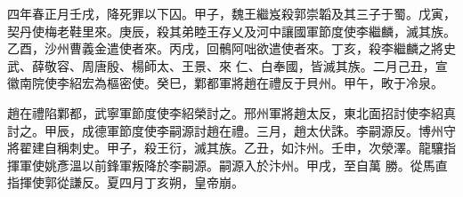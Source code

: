 \begin{pinyinscope}
 四年春正月壬戌，降死罪以下囚。甲子，魏王繼岌殺郭崇韜及其三子于蜀。戊寅，契丹使梅老鞋里來。庚辰，殺其弟睦王存乂及河中讓國軍節度使李繼麟，滅其族。乙酉，沙州曹義金遣使者來。丙戌，回鶻阿咄欲遣使者來。丁亥，殺李繼麟之將史武、薛敬容、周唐殷、楊師太、王景、來
 仁、白奉國，皆滅其族。二月己丑，宣徽南院使李紹宏為樞密使。癸巳，鄴都軍將趙在禮反于貝州。甲午，畋于冷泉。



 趙在禮陷鄴都，武寧軍節度使李紹榮討之。邢州軍將趙太反，東北面招討使李紹真討之。甲辰，成德軍節度使李嗣源討趙在禮。三月，趙太伏誅。李嗣源反。博州守將翟建自稱刺史。甲子，殺王衍，滅其族。乙丑，如汴州。壬申，次滎澤。龍驤指揮軍使姚彥溫以前鋒軍叛降於李嗣源。嗣源入於汴州。甲戌，至自萬
 勝。從馬直指揮使郭從謙反。夏四月丁亥朔，皇帝崩。



\end{pinyinscope}